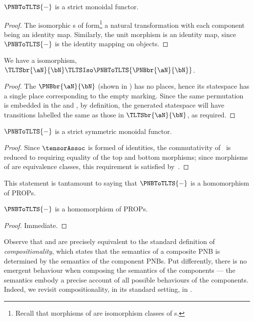 \begin{proposition}
    $\PNBToTLTS{-}$ is a strict monoidal functor.
    \label{prop:PNBToTLTSMonFunctor}
\end{proposition}
\begin{proof}
    The isomorphic \TLTS{}s of  form\footnote{Recall that morphisms of
    \TLTSCat{} are isomorphism classes of \TLTS{}s.} a natural transformation with each component
    being an identity map. Similarly, the unit morphism is an identity map, since $\PNBToTLTS{-}$
    is the identity mapping on objects.
\end{proof}

\begin{proposition} \label{prop:functorBraiding}
    We have a \TLTS{} isomorphism, $\TLTSbr{\aN}{\bN} \TLTSIso
    \PNBToTLTS{\PNBbr{\aN}{\bN}}$.
\end{proposition}
\begin{proof}
    The \PNB{} $\PNBbr{\aN}{\bN}$ (shown in ) has no places,
    hence its \TLTS{} statespace has a single place corresponding to the
    empty marking. Since the same permutation is embedded in the \PNB{} and
    \TLTS{}, by definition, the generated \TLTS{} statespace will have
    transitions labelled the same as those in $\TLTSbr{\aN}{\bN}$, as required.
\end{proof}

\begin{proposition}
    $\PNBToTLTS{-}$ is a strict symmetric monoidal functor.
\end{proposition}
\begin{proof}
    Since $\tensorAssoc$ is formed of identities, the commutativity
    of~ is reduced to requiring equality of the top and bottom
    morphisms; since morphisms of \TLTSCat{} are equivalence classes, this requirement is satisfied
    by~.
\end{proof}

This statement is tantamount to saying that $\PNBToTLTS{-}$ is a homomorphism
of PROPs.

\begin{proposition}
    $\PNBToTLTS{-}$ is a homomorphism of PROPs.
\end{proposition}
\begin{proof}
    Immediate.
\end{proof}

Observe that  and  are
precisely equivalent to the standard definition of \emph{compositionality},
which states that the semantics of a composite PNB is determined by the
semantics of the component PNBs. Put differently, there is no emergent
behaviour when composing the semantics of the components --- the semantics
embody a precise account of all possible behaviours of the components. Indeed,
we revisit compositionality, in its standard setting, in
.

